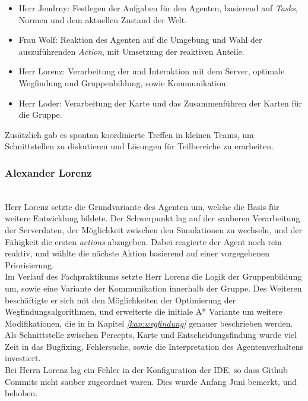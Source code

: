 \begin{itemize}
    \item Herr Jendrny: Festlegen der Aufgaben für den Agenten, basierend auf \textit{Tasks}, Normen und dem aktuellen Zustand der Welt.  
    \item Frau Wolf: Reaktion des Agenten auf die Umgebung und Wahl der auszuführenden \textit{Action}, mit Umsetzung der reaktiven Anteile.
    \item Herr Lorenz: Verarbeitung der \Percepts und Interaktion mit dem Server, optimale Wegfindung und Gruppenbildung, sowie Kommunikation.
    \item Herr Loder: Verarbeitung der Karte und das Zusammenführen der Karten für die Gruppe.
\end{itemize}

Zusätzlich gab es spontan koordinierte Treffen in kleinen Teams, um Schnittstellen zu diskutieren und Lösungen für Teilbereiche zu erarbeiten. 

\subsubsection{Alexander Lorenz} ~\\
Herr Lorenz setzte die Grundvariante des Agenten um, welche die Basis für weitere Entwicklung bildete. Der Schwerpunkt lag auf der sauberen Verarbeitung der Serverdaten, der Möglichkeit zwischen den Simulationen zu wechseln, und der Fähigkeit die ersten \textit{actions} abzugeben. Dabei reagierte der Agent noch rein reaktiv, und wählte die nächste Aktion basierend auf einer vorgegebenen Priorisierung. \\

Im Verlauf des Fachpraktikums setzte Herr Lorenz die Logik der Gruppenbildung um, sowie eine Variante der Kommunikation innerhalb der Gruppe. Des Weiteren beschäftigte er sich mit den Möglichkeiten der Optimierung der Wegfindungsalgorithmen, und erweiterte die initiale A* Variante um weitere Modifikationen, die in in Kapitel \textit{\ref{kap:wegfindung}} genauer beschrieben werden. Als Schnittstelle zwischen Percepts, Karte und Entscheidungsfindung wurde viel Zeit in das Bugfixing, Fehlersuche, sowie die Interpretation des Agentenverhaltens investiert. \\

Bei Herrn Lorenz lag ein Fehler in der Konfiguration der IDE, so dass Github Commits nicht sauber zugeordnet waren. Dies wurde Anfang Juni bemerkt, und behoben.  

